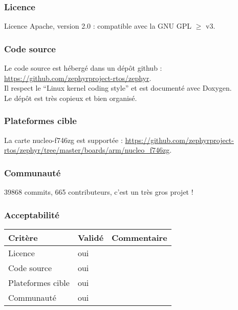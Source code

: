 \subsubsection{Licence}
Licence Apache, version 2.0 : compatible avec la GNU GPL $ \geqslant $ v3.

\subsubsection{Code source}
Le code source est hébergé dans un dépôt github :
\url{https://github.com/zephyrproject-rtos/zephyr}.\\

Il respect le \enquote{Linux kernel coding style} et est documenté avec Doxygen.\\

Le dépôt est très copieux et bien organisé.

\subsubsection{Plateformes cible}
La carte nucleo-f746zg est supportée :
\url{https://github.com/zephyrproject-rtos/zephyr/tree/master/boards/arm/nucleo_f746zg}.

\subsubsection{Communauté}
39868 commits, 665 contributeurs, c'est un très gros projet !

\subsubsection{Acceptabilité}
\begin{tabular}{lll}
\toprule
	Critère				&	Validé		&	Commentaire	\\
\midrule
	Licence				&	oui			&		\\
	Code source			&	oui			&		\\
	Plateformes cible	&	oui			&		\\
	Communauté			&	oui			&		\\
\bottomrule
\end{tabular}

